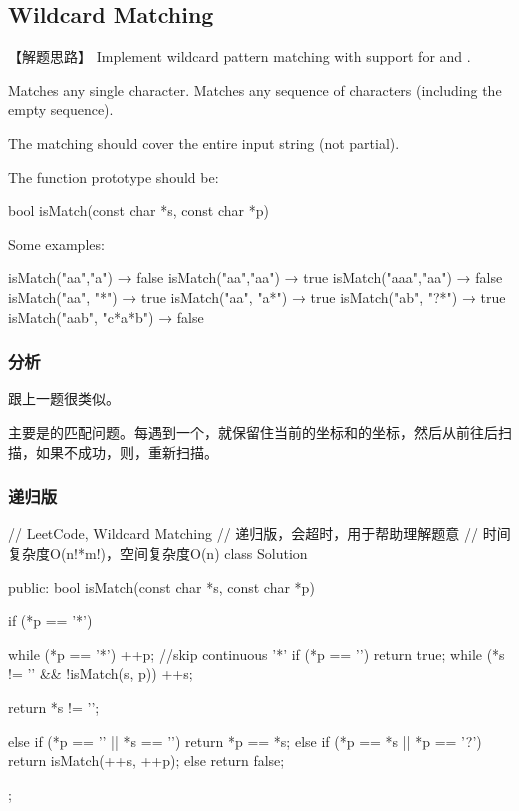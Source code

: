 \subsection{Wildcard Matching} %
\label{sec:wildcard-matching}


【解题思路】
Implement wildcard pattern matching with support for  and .

 Matches any single character.
 Matches any sequence of characters (including the empty sequence).

The matching should cover the entire input string (not partial).

The function prototype should be:
\begin{Code}
	bool isMatch(const char *s, const char *p)
\end{Code}

Some examples:
\begin{Code}
	isMatch("aa","a") → false
	isMatch("aa","aa") → true
	isMatch("aaa","aa") → false
	isMatch("aa", "*") → true
	isMatch("aa", "a*") → true
	isMatch("ab", "?*") → true
	isMatch("aab", "c*a*b") → false
\end{Code}


\subsubsection{分析}
跟上一题很类似。

主要是的匹配问题。每遇到一个，就保留住当前的坐标和的坐标，然后从前往后扫描，如果不成功，则，重新扫描。


\subsubsection{递归版}
\begin{Code}
	// LeetCode, Wildcard Matching
	// 递归版，会超时，用于帮助理解题意
	// 时间复杂度O(n!*m!)，空间复杂度O(n)
	class Solution {
		public:
		bool isMatch(const char *s, const char *p) {
			if (*p == '*') {
				while (*p == '*') ++p;  //skip continuous '*'
				if (*p == '\0') return true;
				while (*s != '\0' && !isMatch(s, p)) ++s;
				
				return *s != '\0';
			}
			else if (*p == '\0' || *s == '\0') return *p == *s;
			else if (*p == *s || *p == '?') return isMatch(++s, ++p);
			else return false;
		}
	};
\end{Code}


